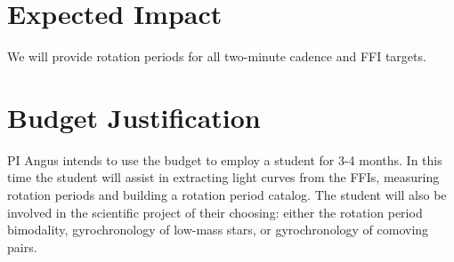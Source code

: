 \documentclass[useAMS, usenatbib, preprint, 12pt]{aastex}
\begin{document}

\section{Expected Impact}
We will provide rotation periods for all two-minute cadence and FFI targets.

\section{Budget Justification}
PI Angus intends to use the budget to employ a student for 3-4 months.
In this time the student will assist in extracting light curves from the FFIs,
measuring rotation periods and building a rotation period catalog.
The student will also be involved in the scientific project of their choosing:
either the rotation period bimodality, gyrochronology of low-mass stars, or
gyrochronology of comoving pairs.


\end{document}
